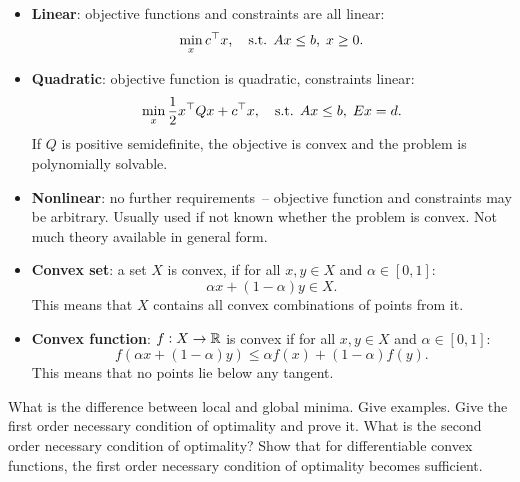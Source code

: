 \documentclass{article}
\begin{document}
\begin{itemize}
\item \textbf{Linear}: objective functions and constraints are all linear:
  \begin{equation*}
    \min_x c^{\top} x, \quad\text{s.t. } Ax \leq b,\; x \geq 0.
  \end{equation*}
\item \textbf{Quadratic}: objective function is quadratic, constraints linear:
  \begin{equation*}
    \min_x \frac{1}{2}x^{\top} Q x + c^{\top} x, \quad\text{s.t. } Ax \leq b,\; Ex = d.
  \end{equation*}
  If \(Q\) is positive semidefinite, the objective is convex and the problem is polynomially
  solvable.
\item \textbf{Nonlinear}: no further requirements~-- objective function and constraints may be
  arbitrary.  Usually used if not known whether the problem is convex.  Not much theory available in
  general form.
\item \textbf{Convex set}: a set \(X\) is convex, if for all \(x, y \in X\) and
  \(\alpha \in [0,1]\):
  \begin{equation*}
    \alpha x + (1 - \alpha) y \in X.
  \end{equation*}
  This means that \(X\) contains all convex combinations of points from it.
\item \textbf{Convex function}: \(f: X \to \mathbb{R}\) is convex if for all \(x, y \in X\) and
  \(\alpha \in [0,1]\):
  \begin{equation*}
    f(\alpha x + (1 - \alpha) y) \leq \alpha f(x) + (1 - \alpha) f(y).
  \end{equation*}
  This means that no points lie below any tangent.
\end{itemize}

\begin{question}
  What is the difference between local and global minima. Give examples.  Give the first order
  necessary condition of optimality and prove it. What is the second order necessary condition of
  optimality? Show that for differentiable convex functions, the first order necessary condition of
  optimality becomes sufficient.
\end{question}
\end{document}

